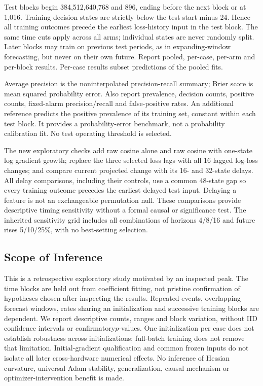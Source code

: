 Test blocks begin 384,512,640,768 and 896, ending before the next block or at 1,016.
Training decision states are strictly below the test start minus 24. Hence all
training outcomes precede the earliest loss-history input in the test block.
The same time cuts apply across all arms; individual states are never randomly
split. Later blocks may train on previous test periods, as in expanding-window
forecasting, but never on their own future. Report pooled, per-case, per-arm
and per-block results. Per-case results subset predictions of the pooled fits.

Average precision is the noninterpolated precision-recall summary; Brier score
is mean squared probability error. Also report prevalence, decision counts,
positive counts, fixed-alarm precision/recall and false-positive rates.
An additional reference predicts the positive prevalence of its training set,
constant within each test block. It provides a probability-error benchmark,
not a probability calibration fit. No test operating threshold is selected.

The new exploratory checks add raw cosine alone and raw cosine with one-state
log gradient growth; replace the three selected loss lags with all 16 lagged
log-loss changes; and compare current projected change with its 16- and 32-state
delays. All delay comparisons, including their controls, use a common 48-state
gap so every training outcome precedes the earliest delayed test input.
Delaying a feature is not an exchangeable permutation null. These comparisons
provide descriptive timing sensitivity without a formal causal or significance
test. The inherited sensitivity grid includes all combinations of horizons
4/8/16 and future rises 5/10/25\%, with no best-setting selection.

\subsection{Scope of Inference}

This is a retrospective exploratory study motivated by an inspected peak.
The time blocks are held out from coefficient fitting, not pristine confirmation
of hypotheses chosen after inspecting the results. Repeated events, overlapping
forecast windows, rates sharing an initialization and successive training blocks
are dependent. We report descriptive counts, ranges and block variation, without
IID confidence intervals or confirmatory$p$-values. One initialization per case
does not establish robustness across initializations; full-batch training does
not remove that limitation. Initial-gradient qualification and common frozen
inputs do not isolate all later cross-hardware numerical effects. No inference
of Hessian curvature, universal Adam stability, generalization, causal mechanism
or optimizer-intervention benefit is made.
